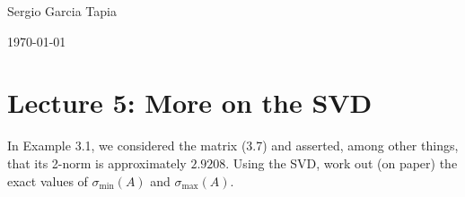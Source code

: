 \documentclass[12pt]{article}
\newenvironment{ex}[2][Exercise]{\begin{trivlist}
		\item[\hskip \labelsep {\bfseries #1}\hskip \labelsep {\bfseries #2.}]}{\end{trivlist}}
\begin{document}

\noindent Sergio Garcia Tapia \hfill

 \hfill 

 \hfill 

\noindent\today
\section*{Lecture 5: More on the SVD}

\begin{ex}{1}
	In Example 3.1, we considered the matrix (3.7) and asserted, among other things, that its 2-norm is
	approximately $2.9208$. Using the SVD, work out (on paper) the exact values of $\sigma_{\text{min}}(A)$ and
	$\sigma_{\text{max}}(A)$.
\end{ex}
\end{document}
